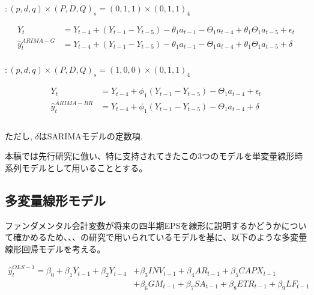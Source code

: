 \documentclass[a4paper, 12pt]{jsarticle}
\begin{document}
\cite{griffin1977time} $: (p, d, q) \times (P, D, Q)_s = (0, 1, 1) \times (0, 1, 1)_4$

\begin{equation}
  \begin{split}
    Y_t &= Y_{t-4} + (Y_{t-1} - Y_{t-5}) - \theta_1a_{t-1} - \Theta_1a_{t-4} + \theta_1\Theta_1a_{t-5} + \epsilon_t \\
    \hat{y}_t^{ARIMA-G} &= Y_{t-4} + (Y_{t-1} - Y_{t-5}) - \theta_1a_{t-1} - \Theta_1a_{t-4} + \theta_1\Theta_1a_{t-5} + \delta \\
  \end{split}
\end{equation}

\cite*{brown1979univariate} $: (p, d, q) \times (P, D, Q)_s = (1, 0, 0) \times (0, 1, 1)_4$

\begin{equation}
  \begin{split}    
    Y_t &= Y_{t-4} + \phi_1(Y_{t-1}-Y_{t-5}) - \Theta_1a_{t-4} + \epsilon_t \\
    \hat{y}_t^{ARIMA-BR} &= Y_{t-4} + \phi_1(Y_{t-1}-Y_{t-5}) - \Theta_1a_{t-4} + \delta \\
    \\
  \end{split}
\end{equation}

ただし, $\delta$はSARIMAモデルの定数項.

本稿では先行研究に倣い、特に支持されてきたこの3つのモデルを単変量線形時系列モデルとして用いることとする。

\subsection{多変量線形モデル}

ファンダメンタル会計変数が将来の四半期EPSを線形に説明するかどうかについて確かめるため、\cite*{lev1993fundamental}、\cite*{abarbanell1997fundamental}、\cite*{lorek1996multivariate}の研究で用いられているモデルを基に、以下のような多変量線形回帰モデルを考える。

\begin{equation}
  \begin{split}
    \label{eq:ols1}
    \hat{y}_t^{OLS-1} = \beta_0 + \beta_1Y_{t-1} + \beta_2Y_{t-4} 
    &+ \beta_3INV_{t-1} + \beta_4AR_{t-1} + \beta_5CAPX_{t-1} \\
    &+ \beta_6GM_{t-1} + \beta_7SA_{t-1} + \beta_8ETR_{t-1} + \beta_9LF_{t-1} \\
  \end{split}
\end{equation}
\end{document}
